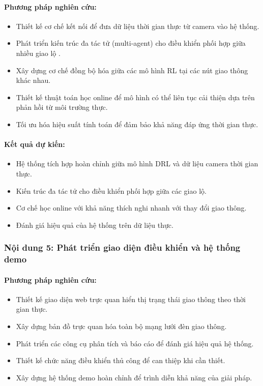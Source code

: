 \documentclass[letterpaper]{article}
\begin{document}
\paragraph{Phương pháp nghiên cứu:}
\begin{itemize}
    \item Thiết kế cơ chế kết nối để đưa dữ liệu thời gian thực từ camera vào hệ thống.
    \item Phát triển kiến trúc đa tác tử (multi-agent) cho điều khiển phối hợp giữa nhiều giao lộ \cite{foerster2018deep}.
    \item Xây dựng cơ chế đồng bộ hóa giữa các mô hình RL tại các nút giao thông khác nhau.
    \item Thiết kế thuật toán học online để mô hình có thể liên tục cải thiện dựa trên phản hồi từ môi trường thực.
    \item Tối ưu hóa hiệu suất tính toán để đảm bảo khả năng đáp ứng thời gian thực.
\end{itemize}

\paragraph{Kết quả dự kiến:}
\begin{itemize}
    \item Hệ thống tích hợp hoàn chỉnh giữa mô hình DRL và dữ liệu camera thời gian thực.
    \item Kiến trúc đa tác tử cho điều khiển phối hợp giữa các giao lộ.
    \item Cơ chế học online với khả năng thích nghi nhanh với thay đổi giao thông.
    \item Đánh giá hiệu quả của hệ thống trên dữ liệu thực.
\end{itemize}

\subsubsection{Nội dung 5: Phát triển giao diện điều khiển và hệ thống demo}

\paragraph{Phương pháp nghiên cứu:}
\begin{itemize}
    \item Thiết kế giao diện web trực quan hiển thị trạng thái giao thông theo thời gian thực.
    \item Xây dựng bản đồ trực quan hóa toàn bộ mạng lưới đèn giao thông.
    \item Phát triển các công cụ phân tích và báo cáo để đánh giá hiệu quả hệ thống.
    \item Thiết kế chức năng điều khiển thủ công để can thiệp khi cần thiết.
    \item Xây dựng hệ thống demo hoàn chỉnh để trình diễn khả năng của giải pháp.
\end{itemize}
\end{document}
